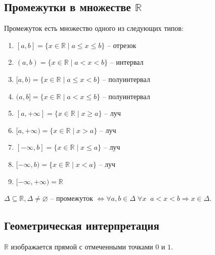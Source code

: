 \documentclass{article}
\begin{document}
\subsection{Промежутки в множестве $\mathbb{R}$}
Промежуток есть множество одного из следующих типов:
\begin{enumerate}
\item $[a,b] =\{x\in\mathbb{R}\mid a\leq x\leq b\}$ -- отрезок
\item $(a,b) =\{x\in\mathbb{R}\mid a< x< b\}$ -- интервал
\item $[a,b) =\{x\in\mathbb{R}\mid a\leq x< b\}$ -- полуинтервал
\item $(a,b] =\{x\in\mathbb{R}\mid a< x\leq b\}$ -- полуинтервал
\item $[a, +\infty] =\{x\in\mathbb{R}\mid x\geq a\}$ -- луч
\item $[a,+\infty) =\{x\in\mathbb{R}\mid x>a\}$ -- луч
\item $[-\infty,b] =\{x\in\mathbb{R}\mid x\leq a\}$ -- луч
\item $[-\infty,b) =\{x\in\mathbb{R}\mid x<a\}$ -- луч
\item $[-\infty,+\infty) =\mathbb{R}$ 
\end{enumerate}

$\Delta\subseteq\mathbb{R}, \Delta\neq\varnothing$ -- промежуток $\Leftrightarrow \forall a, b\in\Delta\; \forall x \;\; a<x<b \Rightarrow x\in\Delta.$
\subsection{Геометрическая интерпретация}
$\mathbb{R}$ изображается прямой с отмеченными точками $0$ и $1.$
\begin{figure}[h]
\end{figure}
\end{document}
